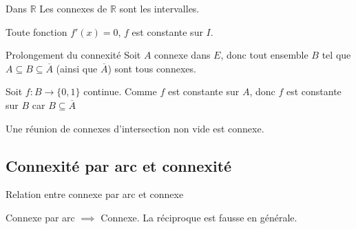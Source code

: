 \begin{Example}{Dans $\mathbb{R}$}{}
Les connexes de $\mathbb{R}$ sont les intervalles.
\end{Example}
\begin{myproof}{}{}
Toute fonction $f'(x) = 0$,  $f$ est constante sur $I$.
\end{myproof}
\begin{Prop}{Prolongement du connexité}{}
  Soit $A$ connexe dans $E$, donc tout ensemble $B$ tel que $A \subseteq B \subseteq \overline{A}$ (ainsi que $\overline{A}$) sont tous connexes.
\end{Prop}

\begin{myproof}{}{}
  Soit $f :B \to \{0,1\}$ continue. Comme $f$ est constante sur $A$, donc $f$ est constante sur $B$ car $B \subseteq \overline{A}$
\end{myproof}

\begin{Prop}{}{}
Une réunion de connexes d'intersection non vide est connexe.
\end{Prop}






\subsection{Connexité par arc et connexité} %
\label{sub:Connexité par arc et connexité}

\begin{Prop}{Relation entre connexe par arc et connexe}{}
\begin{center}
    Connexe par arc $\implies$ Connexe. La réciproque est fausse en générale.
\end{center}
\end{Prop}

